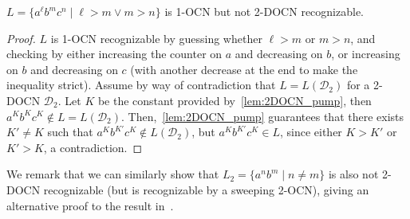 \documentclass[USenglish]{lipics-v2021}
\newcommand{\shtodo}[1]{\todo[color=cyan!25,size=\small]{SH: #1}}
\newcommand{\cD}{\mathcal{D}}
\begin{document}
\begin{corollary}
\label{thm:not_2DOCN_recognizable}
	$L=\{a^\ell b^mc^n \mid \ell > m \lor m > n\}$ is 1-OCN but not 2-DOCN recognizable.
\end{corollary}
\begin{proof}

$L$ is 1-OCN recognizable by guessing whether $\ell>m$ or $m>n$, and checking
by either increasing the counter on $a$ and decreasing on $b$, or increasing
on $b$ and decreasing on $c$ (with another decrease at the end to make the
inequality strict).  Assume by way of contradiction that $L=L(\cD_2)$ for a
2-DOCN $\cD_2$. Let $K$ be the constant provided by~\cref{lem:2DOCN_pump},
then $a^{K}b^Kc^K\notin L=L(\cD_2)$. Then,~\cref{lem:2DOCN_pump} guarantees that
there exists $K'\neq K$ such that $a^{K}b^{K'}c^K\notin L(\cD_2)$, but
$a^{K}b^{K'}c^K\in L$, since either $K>K'$ or $K'>K$, a contradiction.
\end{proof} 
We remark that we can similarly show that $L_2=\{a^nb^m \mid n \neq m\}$ is also not
2-DOCN recognizable (but is recognizable by a sweeping 2-OCN), giving an
alternative proof to the result in~\cite{miyano1982two}.

\end{document}
